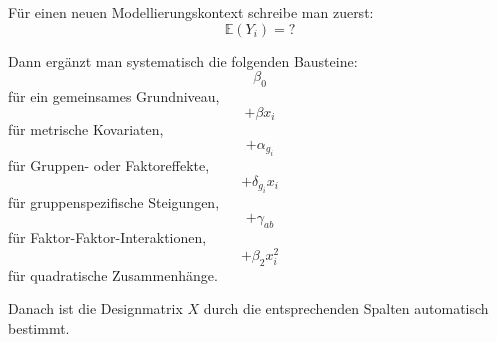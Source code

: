 \documentclass[10pt, letterpaper]{article}
\begin{document}
Für einen neuen Modellierungskontext schreibe man zuerst:
\[
\mathbb E(Y_i)=?
\]

Dann ergänzt man systematisch die folgenden Bausteine:
\[
\beta_0
\]
für ein gemeinsames Grundniveau,
\[
+\beta x_i
\]
für metrische Kovariaten,
\[
+\alpha_{g_i}
\]
für Gruppen- oder Faktoreffekte,
\[
+\delta_{g_i}x_i
\]
für gruppenspezifische Steigungen,
\[
+\gamma_{ab}
\]
für Faktor-Faktor-Interaktionen,
\[
+\beta_2x_i^2
\]
für quadratische Zusammenhänge.

Danach ist die Designmatrix \(X\) durch die entsprechenden Spalten automatisch bestimmt.





\pagebreak
\printbibliography
\end{document}
